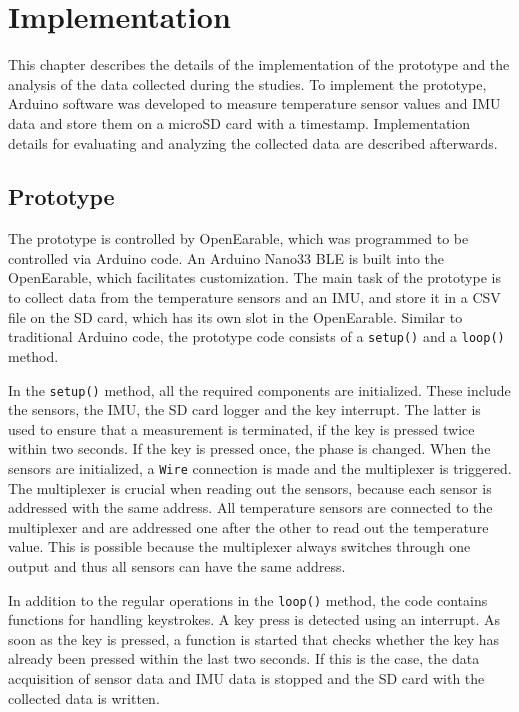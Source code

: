 \chapter{Implementation}
\label{ch:Implementation}
This chapter describes the details of the implementation of the prototype and the analysis of the data collected during the studies.
To implement the prototype, Arduino software was developed to measure temperature sensor values and IMU data and store them on a microSD card with a timestamp.
Implementation details for evaluating and analyzing the collected data are described afterwards.

\section{Prototype}
The prototype is controlled by OpenEarable, which was programmed to be controlled via Arduino code. 
An Arduino Nano33 BLE is built into the OpenEarable, which facilitates customization. 
The main task of the prototype is to collect data from the temperature sensors and an IMU, and store it in a CSV file on the SD card, which has its own slot in the OpenEarable. 
Similar to traditional Arduino code, the prototype code consists of a \texttt{setup()} and a \texttt{loop()} method.

In the \texttt{setup()} method, all the required components are initialized. These include the sensors, the IMU, the SD card logger and the key interrupt. The latter is used to ensure that a measurement is terminated, if the key is pressed twice within two seconds. 
If the key is pressed once, the phase is changed. 
When the sensors are initialized, a \texttt{Wire} connection is made and the multiplexer is triggered.
The multiplexer is crucial when reading out the sensors, because each sensor is addressed with the same address.
All temperature sensors are connected to the multiplexer and are addressed one after the other to read out the temperature value.
This is possible because the multiplexer always switches through one output and thus all sensors can have the same address.

In addition to the regular operations in the \texttt{loop()} method, the code contains functions for handling keystrokes. A key press is detected using an interrupt. As soon as the key is pressed, a function is started that checks whether the key has already been pressed within the last two seconds. If this is the case, the data acquisition of sensor data and IMU data is stopped and the SD card with the collected data is written.


